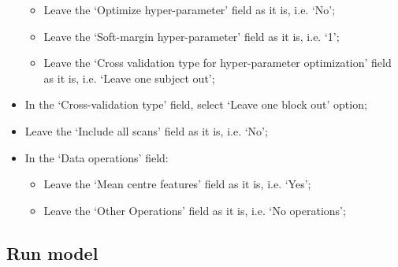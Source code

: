 \begin{itemize}
\begin{itemize}
	\item Leave the `Optimize hyper-parameter' field as it is, i.e. `No';
	
	\item Leave the `Soft-margin hyper-parameter' field as it is, i.e. `1';
	
	\item Leave the `Cross validation type for hyper-parameter optimization' field as it is, i.e. `Leave one subject out';  
	
	
	\end{itemize}
	
	\item In the `Cross-validation type' field, select `Leave one block out' option;
	
	\item Leave the `Include all scans' field as it is, i.e. `No';

	\item In the `Data operations' field:
	
		\begin{itemize}
		\item  Leave the `Mean centre features' field as it is, i.e. `Yes'; 
				
		\item  Leave the `Other Operations' field as it is, i.e. `No operations';
		\end{itemize}
	
\end{itemize}


\subsection{Run model}

